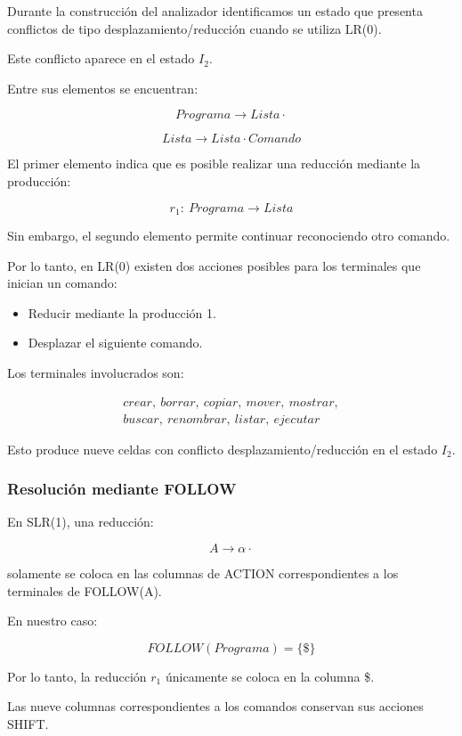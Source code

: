 \documentclass[11pt,letterpaper]{article}
\begin{document}
Durante la construcción del analizador identificamos
un estado que presenta conflictos de tipo
desplazamiento/reducción cuando se utiliza LR(0).

Este conflicto aparece en el estado $I_2$.

Entre sus elementos se encuentran:

\[
Programa \rightarrow Lista\cdot
\]

\[
Lista \rightarrow Lista\cdot Comando
\]

El primer elemento indica que es posible realizar
una reducción mediante la producción:

\[
r_1:\ Programa \rightarrow Lista
\]

Sin embargo, el segundo elemento permite continuar
reconociendo otro comando.

Por lo tanto, en LR(0) existen dos acciones posibles
para los terminales que inician un comando:

\begin{itemize}
    \item Reducir mediante la producción 1.
    \item Desplazar el siguiente comando.
\end{itemize}

Los terminales involucrados son:

\[
\begin{gathered}
crear,\ borrar,\ copiar,\ mover,\ mostrar,\\
buscar,\ renombrar,\ listar,\ ejecutar
\end{gathered}
\]

Esto produce nueve celdas con conflicto
desplazamiento/reducción en el estado $I_2$.

\subsubsection*{Resolución mediante FOLLOW}

En SLR(1), una reducción:

\[
A\rightarrow\alpha\cdot
\]

solamente se coloca en las columnas de ACTION
correspondientes a los terminales de FOLLOW(A).

En nuestro caso:

\[
FOLLOW(Programa)=\{\$\}
\]

Por lo tanto, la reducción $r_1$ únicamente
se coloca en la columna \$.

Las nueve columnas correspondientes a los comandos
conservan sus acciones SHIFT.
\end{document}
